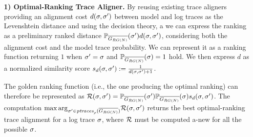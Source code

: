 {\vspace{+0.2cm}
\noindent
\textbf{1) Optimal-Ranking Trace Aligner.}\label{subsec:eta}
By reusing existing trace aligners  \cite{DBLP:conf/edoc/AdriansyahDA11,LeoniM17} providing an alignment cost  $d(\logtrace,\nonlogtrace)$ between model and log traces as the Levenshtein distance and
using the decision theory, a we can express the ranking as a preliminary ranked distance $\probskip{\nonlogtrace} d(\logtrace,\nonlogtrace)$, considering both the alignment cost and the model trace probability.
%
We can represent it 
as a ranking function %
returning $1$ when $\nonlogtrace=\logtrace$ and $\probskip{\logtrace}=1$ hold. We then express $d$ as
a normalized similarity score $s_d(\logtrace,\nonlogtrace):=\frac{1}{d(\logtrace,\nonlogtrace)+1}$. %
{The golden ranking function (i.e., the one producing the optimal ranking) can therefore be represented as $\goldenrank(\logtrace,\nonlogtrace)=\probskip{\nonlogtrace} \probskip{\logtrace} s_d(\logtrace,\nonlogtrace)$. The computation ${\max\arg}_{\nonlogtrace\in \WCal{\pmin}{n}} \goldenrank(\logtrace,{\nonlogtrace})$ returns the best optimal-ranking trace alignment for a log trace $\logtrace$, where $\goldenrank$ must be computed a-new for all the possible $\logtrace$.
	
}}
